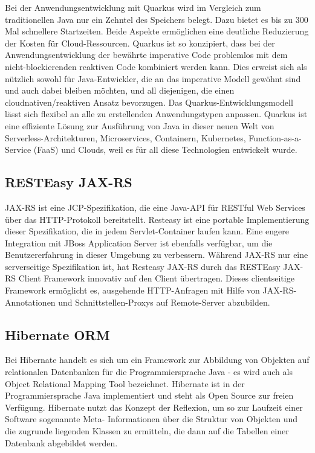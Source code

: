 Bei der Anwendungsentwicklung mit Quarkus wird im Vergleich zum traditionellen Java nur ein Zehntel des Speichers belegt. Dazu bietet es bis zu 300 Mal 
schnellere Startzeiten. Beide Aspekte ermöglichen eine deutliche Reduzierung der Kosten für Cloud-Ressourcen.
Quarkus ist so konzipiert, dass bei der Anwendungsentwicklung der bewährte imperative Code problemlos mit dem nicht-blockierenden reaktiven Code kombiniert werden kann.
Dies erweist sich als nützlich sowohl für Java-Entwickler, die an das imperative Modell gewöhnt sind und auch dabei bleiben möchten, und all diejenigen, die einen cloudnativen/reaktiven Ansatz bevorzugen.
Das Quarkus-Entwicklungsmodell lässt sich flexibel an alle zu erstellenden Anwendungstypen anpassen.
Quarkus ist eine effiziente Lösung zur Ausführung von Java in dieser neuen Welt von Serverless-Architekturen, Microservices, Containern, Kubernetes, 
Function-as-a-Service (FaaS) und Clouds, weil es für all diese Technologien entwickelt wurde.
\cite{sysarch-quarkus-1}

\subsection{RESTEasy JAX-RS}

JAX-RS ist eine JCP-Spezifikation, die eine Java-API für RESTful Web Services über das HTTP-Protokoll bereitstellt. Resteasy ist eine portable Implementierung dieser Spezifikation, 
die in jedem Servlet-Container laufen kann. Eine engere Integration mit JBoss Application Server ist ebenfalls verfügbar, um die Benutzererfahrung in dieser Umgebung zu verbessern. 
Während JAX-RS nur eine serverseitige Spezifikation ist, hat Resteasy JAX-RS durch das RESTEasy JAX-RS Client Framework innovativ auf den Client übertragen. 
Dieses clientseitige Framework ermöglicht es, ausgehende HTTP-Anfragen mit Hilfe von JAX-RS-Annotationen und Schnittstellen-Proxys auf Remote-Server abzubilden.
\cite{sysarch-quarkus-2}

\subsection{Hibernate ORM}

Bei Hibernate handelt es sich um ein Framework zur Abbildung von Objekten auf relationalen Datenbanken für die Programmiersprache Java - es wird auch als Object Relational Mapping Tool bezeichnet. 
Hibernate ist in der Programmiersprache Java implementiert und steht als Open Source zur freien Verfügung. Hibernate nutzt das Konzept der Reflexion, um so zur Laufzeit einer Software sogenannte 
Meta- Informationen über die Struktur von Objekten und die zugrunde liegenden Klassen zu ermitteln, die dann auf die Tabellen einer Datenbank abgebildet werden.
\cite{sysarch-quarkus-3}

